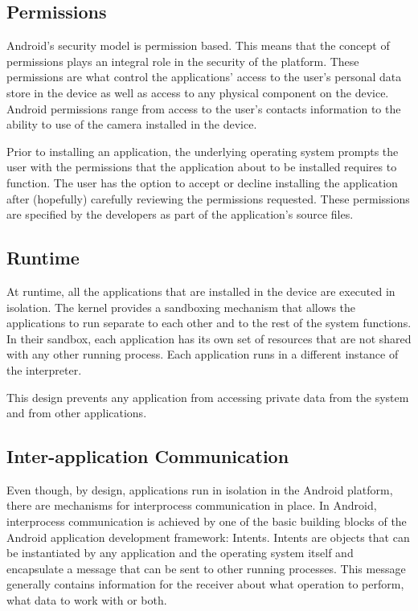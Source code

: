 \documentclass{sig-alternate}
\begin{document}
\subsection{Permissions}

Android's security model is permission based. This means that the concept of permissions plays an integral role in the security of the platform. These permissions are what control the applications' access to the user's personal data store in the device as well as access to any physical component on the device. Android permissions range from access to the user's contacts information to the ability to use of the camera installed in the device.

Prior to installing an application, the underlying operating system prompts the user with the permissions that the application about to be installed requires to function. The user has the option to accept or decline installing the application after (hopefully) carefully reviewing the permissions requested. These permissions are specified by the developers as part of the application's source files.

\subsection{Runtime}

At runtime, all the applications that are installed in the device are executed in isolation. The kernel provides a sandboxing mechanism that allows the applications to run separate to each other and to the rest of the system functions. In their sandbox, each application has its own set of resources that are not shared with any other running process. Each application runs in a different instance of the interpreter. 

This design prevents any application from accessing private data from the system and from other applications.

\subsection{Inter-application Communication}

Even though, by design, applications run in isolation in the Android platform, there are mechanisms for interprocess communication in place. In Android, interprocess communication is achieved by one of the basic building blocks of the Android application development framework: Intents. Intents are objects that can be instantiated by any application and the operating system itself and encapsulate a message that can be sent to other running processes. This message generally contains information for the receiver about what operation to perform, what data to work with or both.
\end{document}
